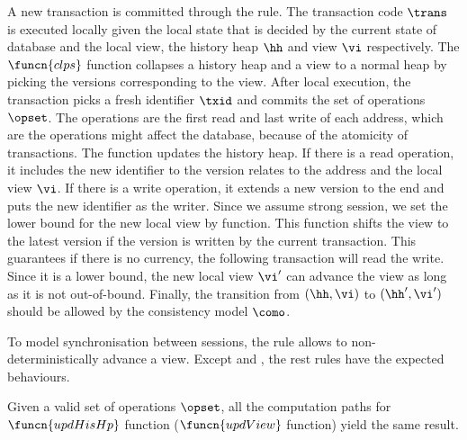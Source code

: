A new transaction is committed through the  rule.
The transaction code \( \trans \) is executed locally given the local state that is decided by the current state of database and the local view, \ie the history heap \( \hh \) and view \( \vi \) respectively.
The \( \funcn{clps} \) function collapses a history heap and a view to a normal heap by picking the versions corresponding to the view.
After local execution, the transaction picks a fresh identifier \( \txid \) and commits the set of operations \( \opset \).
The operations are the first read and last write of each address, which are the operations might affect the database, because of the atomicity of transactions.
The  function updates the history heap.
If there is a read operation, it includes the new identifier to the version relates to the address and the local view \( \vi \).
If there is a write operation, it extends a new version to the end and puts the new identifier as the writer.
Since we assume strong session, we set the lower bound for the new local view by  function.
This function shifts the view to the latest version if the version is written by the current transaction.
This guarantees if there is no currency, the following transaction will read the write.
Since it is a lower bound, the new local view \( \vi' \) can advance the view as long as it is not out-of-bound.
Finally, the transition from \( (\hh, \vi) \) to \( (\hh', \vi') \) should be allowed by the consistency model \( \como \).

To model synchronisation between sessions, the  rule allows to non-deterministically advance a view.
Except  and , the rest rules have the expected behaviours.

\begin{lem}
Given a valid set of operations \( \opset \), all the computation paths for \( \funcn{updHisHp} \) function (\( \funcn{updView} \) function) yield the same result.
\end{lem}


 
